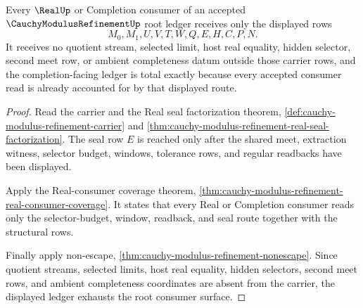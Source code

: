 \begin{theorem}
\label{thm:cauchy-modulus-refinement-root-ledger-nonescape-totality}
Every $\RealUp$ or Completion consumer of an accepted $\CauchyModulusRefinementUp$ root ledger receives only the displayed rows
$$
M_0,M_1,U,V,T,W,Q,E,H,C,P,N.
$$
It receives no quotient stream, selected limit, host real equality, hidden selector, second meet row, or ambient completeness datum outside those carrier rows, and the completion-facing ledger is total exactly because every accepted consumer read is already accounted for by that displayed route.
\end{theorem}
\begin{proof}
Read the carrier and the Real seal factorization theorem, \autoref{def:cauchy-modulus-refinement-carrier} and \autoref{thm:cauchy-modulus-refinement-real-seal-factorization}. The seal row $E$ is reached only after the shared meet, extraction witness, selector budget, windows, tolerance rows, and regular readbacks have been displayed.

Apply the Real-consumer coverage theorem, \autoref{thm:cauchy-modulus-refinement-real-consumer-coverage}. It states that every Real or Completion consumer reads only the selector-budget, window, readback, and seal route together with the structural rows.

Finally apply non-escape, \autoref{thm:cauchy-modulus-refinement-nonescape}. Since quotient streams, selected limits, host real equality, hidden selectors, second meet rows, and ambient completeness coordinates are absent from the carrier, the displayed ledger exhausts the root consumer surface.
\end{proof}

